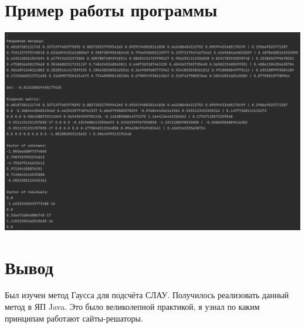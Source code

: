 \documentclass{article}
\begin{document}
\section{Пример работы программы}
\includegraphics[width=1\textwidth]{3}
\section{Вывод}

Был изучен метод Гаусса для подсчёта СЛАУ. Получилось реализовать данный метод в ЯП Java. Это было великолепной практикой, я узнал по каким принципам работают сайты-решаторы.
\end{document}
